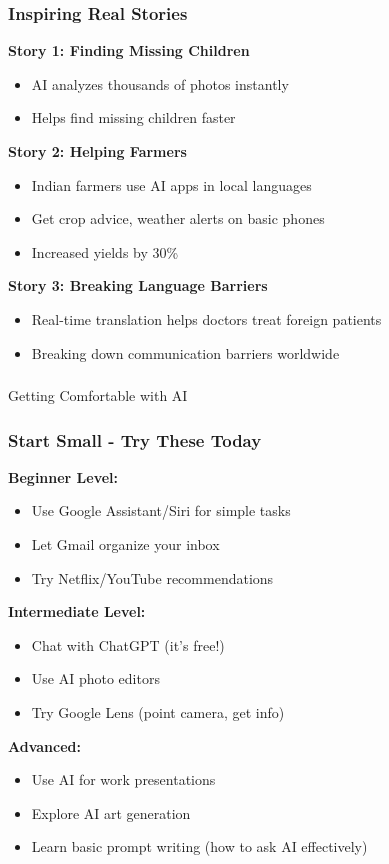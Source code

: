 \begin{frame}[fragile]\frametitle{Inspiring Real Stories}

{\bf Story 1: Finding Missing Children}
\begin{itemize}
\item AI analyzes thousands of photos instantly
\item Helps find missing children faster
\end{itemize}

{\bf Story 2: Helping Farmers}
\begin{itemize}
\item Indian farmers use AI apps in local languages
\item Get crop advice, weather alerts on basic phones
\item Increased yields by 30\%
\end{itemize}

{\bf Story 3: Breaking Language Barriers}
\begin{itemize}
\item Real-time translation helps doctors treat foreign patients
\item Breaking down communication barriers worldwide
\end{itemize}
\end{frame}

\begin{frame}[fragile]\frametitle{}
\begin{center}
{\Large Getting Comfortable with AI}
\end{center}
\end{frame}

\begin{frame}[fragile]\frametitle{Start Small - Try These Today}

{\bf Beginner Level:}
\begin{itemize}
\item Use Google Assistant/Siri for simple tasks
\item Let Gmail organize your inbox
\item Try Netflix/YouTube recommendations
\end{itemize}

{\bf Intermediate Level:}
\begin{itemize}
\item Chat with ChatGPT (it's free!)
\item Use AI photo editors
\item Try Google Lens (point camera, get info)
\end{itemize}

{\bf Advanced:}
\begin{itemize}
\item Use AI for work presentations
\item Explore AI art generation
\item Learn basic prompt writing (how to ask AI effectively)
\end{itemize}
\end{frame}

